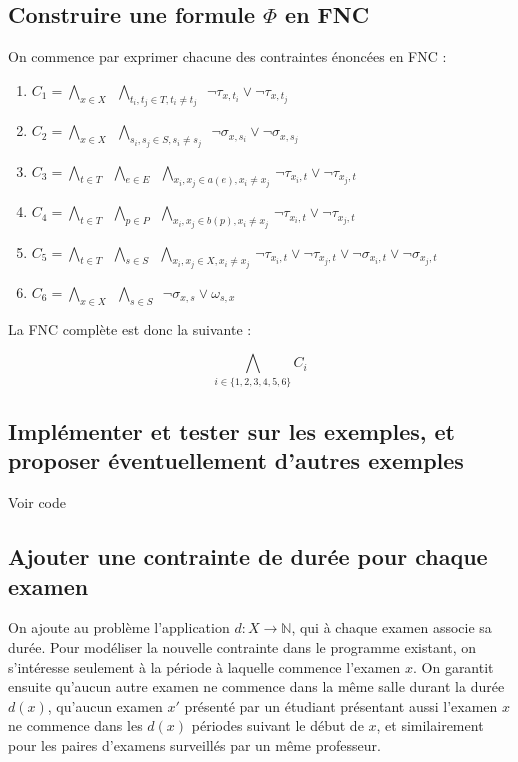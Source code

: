 \documentclass[a4paper]{article}
\begin{document}
\subsection{Construire une formule $\Phi$ en FNC}
On commence par exprimer chacune des contraintes énoncées en FNC :

\begin{enumerate}
  \item $ C_1 = \bigwedge\limits_{x \in X} \,\,\,
          \bigwedge\limits_{t_i, t_j \in T, t_i \neq t_j} \,\,\,
          \lnot \tau_{x,t_i} \lor \lnot \tau_{x,t_j}$
  \item $ C_2 = \bigwedge\limits_{x \in X} \,\,\,
          \bigwedge\limits_{s_i, s_j \in S, s_i \neq s_j} \,\,\,
          \lnot \sigma_{x,s_i} \lor \lnot \sigma_{x,s_j}$
  \item $ C_3 = \bigwedge\limits_{t \in T} \,\,\,
          \bigwedge\limits_{e \in E} \,\,\,
          \bigwedge\limits_{x_i, x_j \in a(e), x_i \neq x_j} \,
          \lnot \tau_{x_i,t} \lor \lnot \tau_{x_j,t}$
  \item $ C_4 = \bigwedge\limits_{t \in T} \,\,\,
          \bigwedge\limits_{p \in P} \,\,\,
          \bigwedge\limits_{x_i, x_j \in b(p), x_i \neq x_j} \,
          \lnot \tau_{x_i,t} \lor \lnot \tau_{x_j,t}$
  \item $ C_5 = \bigwedge\limits_{t \in T} \,\,\,
          \bigwedge\limits_{s \in S} \,\,\,
          \bigwedge\limits_{x_i, x_j \in X, x_i \neq x_j} \,
          \lnot \tau_{x_i,t} \lor \lnot \tau_{x_j,t} \lor \lnot \sigma_{x_i,t} \lor \lnot \sigma_{x_j,t}$
  \item $ C_6 = \bigwedge\limits_{x \in X} \,\,\,
          \bigwedge\limits_{s \in S} \,\,\,
          \lnot \sigma_{x,s} \lor \omega_{s,x}$
\end{enumerate}

La FNC complète est donc la suivante :

$$ \bigwedge\limits_{i \in \{1, 2, 3, 4, 5, 6\}} C_i$$

\subsection{Implémenter et tester sur les exemples, et proposer éventuellement d’autres exemples}
Voir code

\subsection{Ajouter une contrainte de durée pour chaque examen}
On ajoute au problème l'application $ d : X \rightarrow \mathbb{N} $, qui à chaque examen associe
sa durée. Pour modéliser la nouvelle contrainte dans le programme existant, on s'intéresse seulement à la période
à laquelle commence l'examen $x$. On garantit ensuite qu'aucun autre examen ne commence dans la même salle durant
la durée $d(x)$, qu'aucun examen $x'$ présenté par un étudiant présentant aussi l'examen $x$ ne commence dans les
$d(x)$ périodes suivant le début de $x$, et similairement pour les paires d'examens surveillés par un même professeur.
\end{document}
